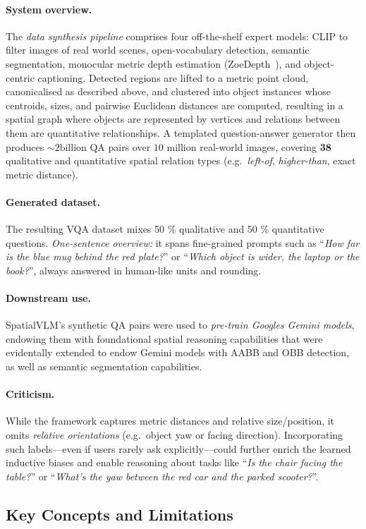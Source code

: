 \paragraph{System overview.}
The \emph{data synthesis pipeline} comprises four off-the-shelf expert models: CLIP to filter images of real world scenes, open-vocabulary detection, semantic segmentation, monocular metric depth estimation (ZoeDepth~\cite{ZoeDepthBhat2023}), and object-centric captioning.  Detected regions are lifted to a metric point cloud, canonicalised as described above, and clustered into object instances whose centroids, sizes, and pairwise Euclidean distances are computed, resulting in a spatial graph where objects are represented by vertices and relations between them are quantitative relationships. A templated question-answer generator then produces \(\sim\!2\text{billion}\) QA pairs over \(10\text{ million}\) real-world images, covering \textbf{38} qualitative and quantitative spatial relation types (e.g.\ \emph{left-of}, \emph{higher-than}, exact metric distance).

\paragraph{Generated dataset.}
The resulting VQA dataset mixes 50 \% qualitative and 50 \% quantitative questions.  \emph{One-sentence overview:} it spans fine-grained prompts such as ``\textit{How far is the blue mug behind the red plate?}'' or ``\textit{Which object is wider, the laptop or the book?}'', always answered in human-like units and rounding.

\paragraph{Downstream use.}
SpatialVLM's synthetic QA pairs were used to \emph{pre-train Googles Gemini models}, endowing them with foundational spatial reasoning capabilities that were evidentally extended to endow Gemini models with AABB and OBB detection, as well as semantic segmentation capabilities.

\paragraph{Criticism.}
While the framework captures metric distances and relative size/position, it omits \emph{relative orientations} (e.g.\ object yaw or facing direction).  Incorporating such labels—even if users rarely ask explicitly—could further enrich the learned inductive biases and enable reasoning about tasks like ``\emph{Is the chair facing the table?}'' or ``\emph{What's the yaw between the red car and the parked scooter?}''.

\subsection{Key Concepts and Limitations}
